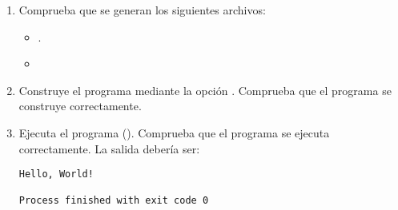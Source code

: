 \begin{enumerate}
\begin{enumerate}
\item Comprueba que se generan los siguientes archivos:
\begin{itemize}
  \item {}.
  \item {}
\end{itemize}

\item Construye el programa mediante la opción . 
Comprueba que el programa se construye correctamente.

\item Ejecuta el programa ().
Comprueba que el programa se ejecuta correctamente. La salida debería ser:

\begin{lstlisting}[style=terminal]
Hello, World!

Process finished with exit code 0
\end{lstlisting}

\end{enumerate}

\end{enumerate}

